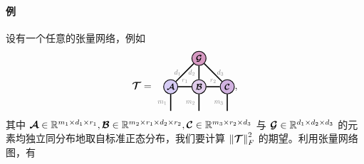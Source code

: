 \paragraph{例} 设有一个任意的张量网络，例如
$$\Tt = 
\begin{tikzpicture}[baseline=\baseline]
   \tikzset{tensor/.style = {minimum size = 0.5cm,shape = circle,thick,draw=black,inner sep = 0pt}, edge/.style = {thick,line width=.4mm},every loop/.style={}}
    \def\y{0}
    \def\x{0}
    \node[tensor,fill=red!20!blue!20!white] (A) at (\x,\y){\scalebox{0.85}{$\At$}}; 
    \node[tensor,fill=red!40!blue!20!white] (B) at (\x+1,\y){\scalebox{0.85}{$\Bt$}};
    \node[tensor,fill=red!40!blue!30!white] (C) at (\x+2,\y){\scalebox{0.85}{$\Ct$}};
    \node[tensor,fill=red!60!blue!40!white] (G) at (\x+1,\y+1){\scalebox{0.85}{$\Gt$}};
    \draw[edge](A)--(B)node[midway,above] {\scalebox{0.7}{\dimcolor{$r_1$}}};
    \draw[edge](B)--(C)node[midway,above] {\scalebox{0.7}{\dimcolor{$r_2$}}};
    \draw[edge](G)--(A)node[midway,left] {\scalebox{0.7}{\dimcolor{$d_1$}}};
    \draw[edge](G)--(B)node[midway,left] {\scalebox{0.7}{\dimcolor{$d_2$}}};
    \draw[edge](G)--(C)node[midway,right] {\scalebox{0.7}{\dimcolor{$d_3$}}};
    \draw[edge](A)--(\x,\y-0.85)node[midway,left] {\scalebox{0.7}{\dimcolor{$m_1$}}};
    \draw[edge](B)--(\x+1,\y-0.85)node[midway,left] {\scalebox{0.7}{\dimcolor{$m_2$}}};
    \draw[edge](C)--(\x+2,\y-0.85)node[midway,left] {\scalebox{0.7}{\dimcolor{$m_3$}}};
\end{tikzpicture},
$$
其中 $\bm{\mathcal{A}}\in\mathbb{R}^{m_1\times d_1\times r_1}, \bm{\mathcal{B}}\in\mathbb{R}^{m_2\times r_1\times d_2\times r_2}, \bm{\mathcal{C}}\in\mathbb{R}^{m_3\times r_2\times d_3}$ 与 $\bm{\mathcal{G}}\in\mathbb{R}^{d_1\times d_2\times d_3}$ 的元素均独立同分布地取自标准正态分布，我们要计算 $\left\lVert\bm{\mathcal{T}}\right\rVert^2_F$ 的期望。利用张量网络图，有
